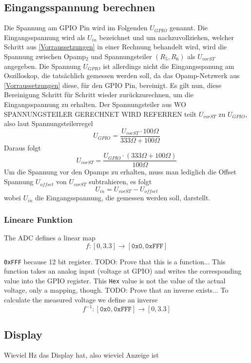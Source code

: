 \subsection{Eingangsspannung berechnen}
Die Spannung am GPIO Pin  wird im Folgenden $U_{GPIO}$ genannt. \newline
Die Eingangsspannung wird als $U_{in}$ bezeichnet und
um nachzuvollziehen, welcher Schritt aus \ref{Vorraussetzungen} in einer Rechnung behandelt wird, wird die Spannung zwischen Opamp$_2$ und Spannungsteiler $(R_5, R_6)$ als $U_{vorST}$ angegeben. \newline
Die Spannung $U_{GPIO}$ ist allerdings nicht die Eingangsspanung am Oszilloskop, die tatsächlich gemessen werden soll, da
das Opamp-Netzwerk aus \ref{Vorraussetzungen} diese, für den GPIO Pin, bereinigt.
Es gilt nun, diese Bereinigung Schritt für Schritt wieder zurückzurechnen, um die Eingangsspannung zu erhalten. \newline
Der Spannungsteiler aus WO SPANNUNGSTEILER GERECHNET WIRD REFERREN teilt $U_{vorST}$
zu $U_{GPIO}$, also laut Spannungsteilerregel
$$
	U_{GPIO} = \frac{U_{vorST} \cdot 100 \Omega}{333 \Omega + 100 \Omega}
$$
Daraus folgt
$$
	U_{vorST} = \frac{U_{GPIO} \cdot (333 \Omega + 100 \Omega)}{100 \Omega}
$$
\newline
Um die Spannung vor den Opamps zu erhalten, muss man lediglich die Offset Spannung $U_{offset}$
von $U_{vorST}$ subtrahieren, es folgt
$$
	U_{in} = U_{vorST} - U_{offset}
$$
wobei $U_{in}$ die Eingangsspannung, die gemessen werden soll, darstellt.

\subsubsection{Lineare Funktion}
The ADC defines a linear map
$$
	f: [0,3.3] \rightarrow [\texttt{0x0}, \texttt{0xFFF}]
$$

\texttt{0xFFF} because 12 bit register. \newline
TODO: Prove that this is a function... \newline
This function takes an analog input (voltage at GPIO) and writes the corresponding value into the GPIO register. \newline
This \texttt{Hex} value is not the value of the actual voltage, only a mapping, though.
TODO: Prove that an inverse exists... \newline
To calculate the measured voltage we define an inverse
$$
	f^{-1}: [\texttt{0x0}, \texttt{0xFFF}] \rightarrow [0, 3.3]
$$

\subsection{Display}

Wieviel Hz das Display hat, also wieviel Anzeige ist
